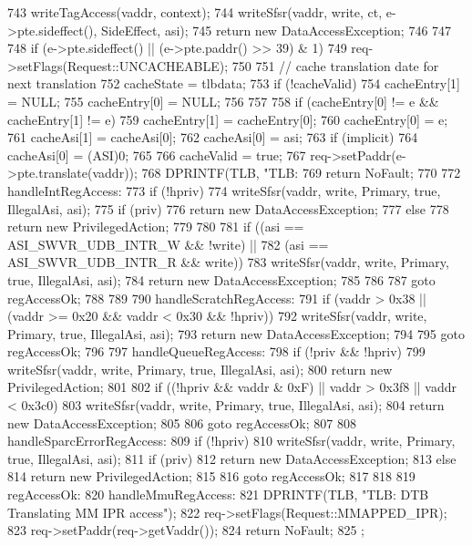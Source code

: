 \begin{DoxyCode}
{{743         writeTagAccess(vaddr, context);
744         writeSfsr(vaddr, write, ct, e->pte.sideffect(), SideEffect, asi);
745         return new DataAccessException;
746     }
747 
748     if (e->pte.sideffect() || (e->pte.paddr() >> 39) & 1)
749         req->setFlags(Request::UNCACHEABLE);
750 
751     // cache translation date for next translation
752     cacheState = tlbdata;
753     if (!cacheValid) {
754         cacheEntry[1] = NULL;
755         cacheEntry[0] = NULL;
756     }
757 
758     if (cacheEntry[0] != e && cacheEntry[1] != e) {
759         cacheEntry[1] = cacheEntry[0];
760         cacheEntry[0] = e;
761         cacheAsi[1] = cacheAsi[0];
762         cacheAsi[0] = asi;
763         if (implicit)
764             cacheAsi[0] = (ASI)0;
765     }
766     cacheValid = true;
767     req->setPaddr(e->pte.translate(vaddr));
768     DPRINTF(TLB, "TLB: %
769     return NoFault;
770 
772 handleIntRegAccess:
773     if (!hpriv) {
774         writeSfsr(vaddr, write, Primary, true, IllegalAsi, asi);
775         if (priv)
776             return new DataAccessException;
777          else
778             return new PrivilegedAction;
779     }
780 
781     if ((asi == ASI_SWVR_UDB_INTR_W && !write) ||
782         (asi == ASI_SWVR_UDB_INTR_R && write)) {
783         writeSfsr(vaddr, write, Primary, true, IllegalAsi, asi);
784         return new DataAccessException;
785     }
786 
787     goto regAccessOk;
788 
789 
790 handleScratchRegAccess:
791     if (vaddr > 0x38 || (vaddr >= 0x20 && vaddr < 0x30 && !hpriv)) {
792         writeSfsr(vaddr, write, Primary, true, IllegalAsi, asi);
793         return new DataAccessException;
794     }
795     goto regAccessOk;
796 
797 handleQueueRegAccess:
798     if (!priv  && !hpriv) {
799         writeSfsr(vaddr, write, Primary, true, IllegalAsi, asi);
800         return new PrivilegedAction;
801     }
802     if ((!hpriv && vaddr & 0xF) || vaddr > 0x3f8 || vaddr < 0x3c0) {
803         writeSfsr(vaddr, write, Primary, true, IllegalAsi, asi);
804         return new DataAccessException;
805     }
806     goto regAccessOk;
807 
808 handleSparcErrorRegAccess:
809     if (!hpriv) {
810         writeSfsr(vaddr, write, Primary, true, IllegalAsi, asi);
811         if (priv)
812             return new DataAccessException;
813          else
814             return new PrivilegedAction;
815     }
816     goto regAccessOk;
817 
818 
819 regAccessOk:
820 handleMmuRegAccess:
821     DPRINTF(TLB, "TLB: DTB Translating MM IPR access\n");
822     req->setFlags(Request::MMAPPED_IPR);
823     req->setPaddr(req->getVaddr());
824     return NoFault;
825 };
\end{DoxyCode}

